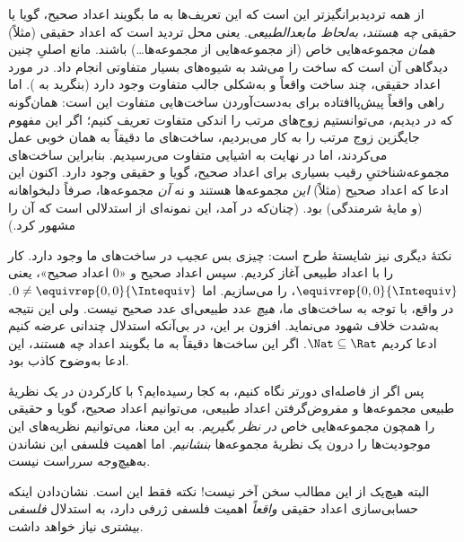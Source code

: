 \documentclass[../../../include/open-logic-section]{subfiles}
\begin{document}
از همه تردیدبرانگیزتر این است که این تعریف‌ها به ما بگویند اعداد صحیح،
گویا یا حقیقی \emph{چه هستند}، \emph{به‌لحاظ مابعدالطبیعی}. یعنی محل تردید است که
اعداد حقیقی (مثلاً) \emph{همان} مجموعه‌هایی خاص (از مجموعه‌هایی از
مجموعه‌ها\ldots) باشند. مانع اصلیِ چنین دیدگاهی آن است که ساخت را
می‌شد به شیوه‌های بسیار متفاوتی انجام داد. در مورد اعداد حقیقی، چند ساخت
واقعاً و به‌شکلی جالب متفاوت وجود دارد (بنگرید به ).
اما راهی واقعاً پیش‌پاافتاده برای به‌دست‌آوردن ساخت‌هایی متفاوت این است:
همان‌گونه که در  دیدیم، می‌توانستیم زوج‌های مرتب
را اندکی متفاوت تعریف کنیم؛ اگر این مفهوم جایگزین زوج مرتب را به کار
می‌بردیم، ساخت‌های ما دقیقاً به همان خوبی عمل می‌کردند، اما در نهایت به
اشیایی متفاوت می‌رسیدیم. بنابراین ساخت‌های مجموعه‌شناختیِ رقیب بسیاری برای
اعداد صحیح، گویا و حقیقی وجود دارد. اکنون این ادعا که اعداد صحیح (مثلاً)
\emph{این} مجموعه‌ها هستند و نه \emph{آن} مجموعه‌ها، صرفاً دلبخواهانه (و
مایهٔ شرمندگی) بود. (چنان‌که در  آمد، این نمونه‌ای
از استدلالی است که \citealt{Benacerraf1965} آن را مشهور کرد.)

نکتهٔ دیگری نیز شایستهٔ طرح است: چیزی بس \emph{عجیب} در ساخت‌های ما وجود
دارد. کار را با اعداد طبیعی آغاز کردیم. سپس اعداد صحیح و «$0$ اعداد صحیح»،
یعنی $ \equivrep{0,0}{\Intequiv}$، را می‌سازیم. اما $0 \neq
\equivrep{0,0}{\Intequiv}$. در واقع، با توجه به ساخت‌های ما، \emph{هیچ}
عدد طبیعی‌ای عدد صحیح نیست. ولی این نتیجه به‌شدت خلاف شهود می‌نماید. افزون
بر این، در  بی‌آنکه استدلال چندانی عرضه کنیم
ادعا کردیم $\Nat \subseteq \Rat$. اگر این ساخت‌ها دقیقاً به ما بگویند
اعداد \emph{چه هستند}، این ادعا به‌وضوح کاذب بود.

پس اگر از فاصله‌ای دورتر نگاه کنیم، به کجا رسیده‌ایم؟ با کارکردن در یک
نظریهٔ طبیعی مجموعه‌ها و مفروض‌گرفتن اعداد طبیعی، می‌توانیم اعداد صحیح،
گویا و حقیقی را همچون مجموعه‌هایی خاص \emph{در نظر بگیریم}. به این معنا،
می‌توانیم نظریه‌های این موجودیت‌ها را درون یک نظریهٔ مجموعه‌ها \emph{بنشانیم}.
اما اهمیت فلسفی این نشاندن به‌هیچ‌وجه سرراست نیست.

البته هیچ‌یک از این مطالب سخن آخر نیست!{} نکته فقط این است. نشان‌دادن اینکه
حسابی‌سازی اعداد حقیقی \emph{واقعاً} اهمیت فلسفی ژرفی دارد، به استدلال
\emph{فلسفی} بیشتری نیاز خواهد داشت.

\end{document}
